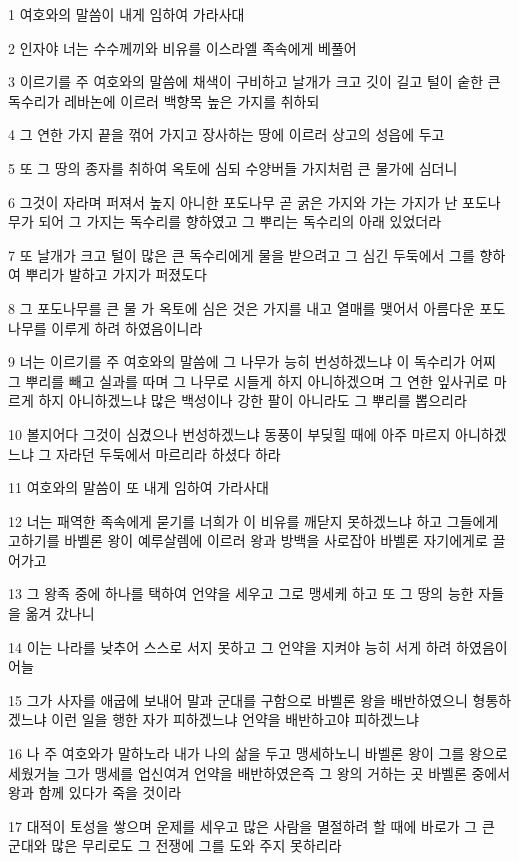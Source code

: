 \par 1 여호와의 말씀이 내게 임하여 가라사대
\par 2 인자야 너는 수수께끼와 비유를 이스라엘 족속에게 베풀어
\par 3 이르기를 주 여호와의 말씀에 채색이 구비하고 날개가 크고 깃이 길고 털이 숱한 큰 독수리가 레바논에 이르러 백향목 높은 가지를 취하되
\par 4 그 연한 가지 끝을 꺾어 가지고 장사하는 땅에 이르러 상고의 성읍에 두고
\par 5 또 그 땅의 종자를 취하여 옥토에 심되 수양버들 가지처럼 큰 물가에 심더니
\par 6 그것이 자라며 퍼져서 높지 아니한 포도나무 곧 굵은 가지와 가는 가지가 난 포도나무가 되어 그 가지는 독수리를 향하였고 그 뿌리는 독수리의 아래 있었더라
\par 7 또 날개가 크고 털이 많은 큰 독수리에게 물을 받으려고 그 심긴 두둑에서 그를 향하여 뿌리가 발하고 가지가 퍼졌도다
\par 8 그 포도나무를 큰 물 가 옥토에 심은 것은 가지를 내고 열매를 맺어서 아름다운 포도나무를 이루게 하려 하였음이니라
\par 9 너는 이르기를 주 여호와의 말씀에 그 나무가 능히 번성하겠느냐 이 독수리가 어찌 그 뿌리를 빼고 실과를 따며 그 나무로 시들게 하지 아니하겠으며 그 연한 잎사귀로 마르게 하지 아니하겠느냐 많은 백성이나 강한 팔이 아니라도 그 뿌리를 뽑으리라
\par 10 볼지어다 그것이 심겼으나 번성하겠느냐 동풍이 부딪힐 때에 아주 마르지 아니하겠느냐 그 자라던 두둑에서 마르리라 하셨다 하라
\par 11 여호와의 말씀이 또 내게 임하여 가라사대
\par 12 너는 패역한 족속에게 묻기를 너희가 이 비유를 깨닫지 못하겠느냐 하고 그들에게 고하기를 바벨론 왕이 예루살렘에 이르러 왕과 방백을 사로잡아 바벨론 자기에게로 끌어가고
\par 13 그 왕족 중에 하나를 택하여 언약을 세우고 그로 맹세케 하고 또 그 땅의 능한 자들을 옮겨 갔나니
\par 14 이는 나라를 낮추어 스스로 서지 못하고 그 언약을 지켜야 능히 서게 하려 하였음이어늘
\par 15 그가 사자를 애굽에 보내어 말과 군대를 구함으로 바벨론 왕을 배반하였으니 형통하겠느냐 이런 일을 행한 자가 피하겠느냐 언약을 배반하고야 피하겠느냐
\par 16 나 주 여호와가 말하노라 내가 나의 삶을 두고 맹세하노니 바벨론 왕이 그를 왕으로 세웠거늘 그가 맹세를 업신여겨 언약을 배반하였은즉 그 왕의 거하는 곳 바벨론 중에서 왕과 함께 있다가 죽을 것이라
\par 17 대적이 토성을 쌓으며 운제를 세우고 많은 사람을 멸절하려 할 때에 바로가 그 큰 군대와 많은 무리로도 그 전쟁에 그를 도와 주지 못하리라

